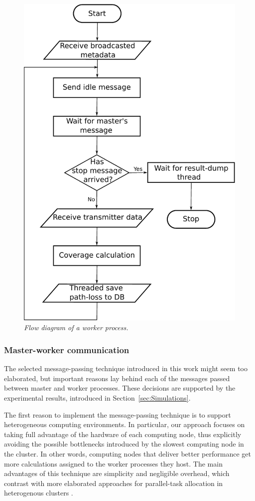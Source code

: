 \begin{figure}
\centering

\includegraphics[width=0.7\columnwidth]{04-framework_design_and_implementation/img/worker_process_flow_diagram}

\caption{\textit{\emph{Flow diagram of a worker process.\label{fig:worker_process_flow_diagram}}}}
\end{figure}



\subsubsection{Master-worker communication\label{sub:Master-worker-communication}}

The selected message-passing technique introduced in this work might
seem too elaborated, but important reasons lay behind each of the
messages passed between master and worker processes. These decisions
are supported by the experimental results, introduced in Section~\ref{sec:Simulations}.

The first reason to implement the message-passing technique is to
support heterogeneous computing environments. In particular, our approach
focuses on taking full advantage of the hardware of each computing
node, thus explicitly avoiding the possible bottlenecks introduced
by the slowest computing node in the cluster. In other words, computing
nodes that deliver better performance get more calculations assigned
to the worker processes they host. The main advantages of this technique
are simplicity and negligible overhead, which contrast with more elaborated
approaches for parallel-task allocation in heterogenous clusters \cite{Bosque_A_parallel_computational_model_for_heterogenous_clusters:2006}.

